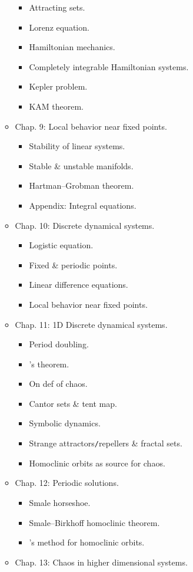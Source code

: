 \documentclass{article}
\begin{document}
\begin{enumerate}
\begin{itemize}
\begin{itemize}
			\item {\sf Attracting sets.}
			\item {\sf Lorenz equation.}
			\item {\sf Hamiltonian mechanics.}
			\item {\sf Completely integrable Hamiltonian systems.}
			\item {\sf Kepler problem.}
			\item {\sf KAM theorem.}
		\end{itemize}
		\item {\sf Chap. 9: Local behavior near fixed points.}
		\begin{itemize}
			\item {\sf Stability of linear systems.}
			\item {\sf Stable \& unstable manifolds.}
			\item {\sf Hartman--Grobman theorem.}
			\item {\sf Appendix: Integral equations.}
		\end{itemize}
		\item {\sf Chap. 10: Discrete dynamical systems.}
		\begin{itemize}
			\item {\sf Logistic equation.}
			\item {\sf Fixed \& periodic points.}
			\item {\sf Linear difference equations.}
			\item {\sf Local behavior near fixed points}.
		\end{itemize}
		\item {\sf Chap. 11: 1D Discrete dynamical systems.}
		\begin{itemize}
			\item {\sf Period doubling.}
			\item {'s theorem.}
			\item {\sf On def of chaos.}
			\item {\sf Cantor sets \& tent map.}
			\item {\sf Symbolic dynamics.}
			\item {\sf Strange attractors{\tt/}repellers \& fractal sets.}
			\item {\sf Homoclinic orbits as source for chaos.}
		\end{itemize}
		\item {\sf Chap. 12: Periodic solutions.}
		\begin{itemize}
			\item {\sf Smale horseshoe.}
			\item {\sf Smale--Birkhoff homoclinic theorem.}
			\item {'s method for homoclinic orbits.}
		\end{itemize}
		\item {\sf Chap. 13: Chaos in higher dimensional systems.}
	\end{itemize}
\end{enumerate}
\end{document}
